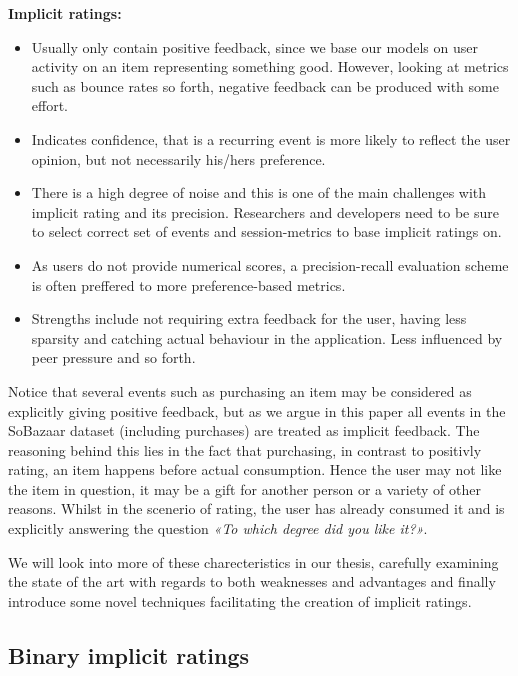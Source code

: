 \textbf{Implicit ratings:}
\begin{itemize}
\item Usually only contain positive feedback, since we base our models on user
activity on an item representing something good. However, looking at metrics
such as bounce rates so forth, negative feedback can be produced with some
effort.
\item Indicates confidence, that is a recurring event is more likely to reflect
the user opinion, but not necessarily his/hers preference.
\item There is a high degree of noise and this is one of the main challenges
with implicit rating and its precision. Researchers and developers need to be
sure to select correct set of events and session-metrics to base implicit
ratings on.
\item As users do not provide numerical scores, a precision-recall evaluation
scheme is often preffered to more preference-based metrics.
\item Strengths include not requiring extra feedback for the user, having less
sparsity and catching actual behaviour in the application. Less influenced by
peer pressure and so forth.
\end{itemize}

Notice that several events such as purchasing an item may be considered as
explicitly giving positive feedback, but as we argue in this paper all events
in the SoBazaar dataset (including purchases) are treated as implicit feedback.
The reasoning behind this lies in the fact that purchasing, in contrast to
positivly rating, an item happens before actual consumption. Hence the user may
not like the item in question, it may be a gift for another person or a variety
of other reasons. Whilst in the scenerio of rating, the user has already
consumed it and is explicitly answering the question \textit{«To which degree
did you like it?»}.

We will look into more of these charecteristics in our thesis, carefully
examining the state of the art with regards to both weaknesses and advantages
and finally introduce some novel techniques facilitating the creation of
implicit ratings.

\clearpage

\subsection{Binary implicit ratings}

